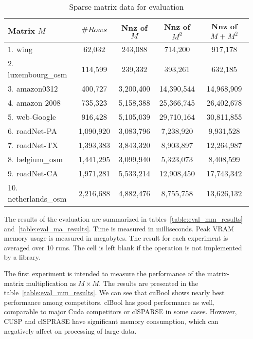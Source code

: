 {\setlength{\tabcolsep}{0.3em}
\begin{table}
\centering
{
\caption{Sparse matrix data for evaluation}
\label{table:sparse_matrices}
\scriptsize
{}
\begin{tabular}{|l|c|c|c|c|}
\hline
Matrix $M$           & $\# Rows$    & Nnz of $M$   & Nnz of $M^2$   & Nnz of $M + M^2$ \\
\hline
\hline
1.  wing             &    62,032    &   243,088    &    714,200     &    917,178       \\
2.  luxembourg\_osm  &   114,599    &   239,332    &    393,261     &    632,185       \\
3.  amazon0312       &   400,727    & 3,200,400    & 14,390,544     & 14,968,909       \\
4.  amazon-2008      &   735,323    & 5,158,388    & 25,366,745     & 26,402,678       \\
5.  web-Google       &   916,428    & 5,105,039    & 29,710,164     & 30,811,855       \\
6.  roadNet-PA       & 1,090,920    & 3,083,796    &  7,238,920     &  9,931,528       \\
7.  roadNet-TX       & 1,393,383    & 3,843,320    &  8,903,897     & 12,264,987       \\
8.  belgium\_osm     & 1,441,295    & 3,099,940    &  5,323,073     &  8,408,599       \\
9.  roadNet-CA       & 1,971,281    & 5,533,214    & 12,908,450     & 17,743,342       \\
10. netherlands\_osm & 2,216,688    & 4,882,476    &  8,755,758     & 13,626,132       \\ 
\hline
\end{tabular}
}
\end{table}
}

The results of the evaluation are summarized in tables~\ref{table:eval_mm_results} and~\ref{table:eval_ma_results}.
Time is measured in milliseconds. 
Peak VRAM memory usage is measured in megabytes.
The result for each experiment is averaged over 10 runs.
The cell is left blank if the operation is not implemented by a library.

The first experiment is intended to measure the performance of the matrix-matrix multiplication as $M \times M$.
The results are presented in the table~\ref{table:eval_mm_results}.
We can see that cuBool shows nearly best performance among competitors.
clBool has good performance as well, comparable to major Cuda competitors or clSPARSE in some cases.  
However, CUSP and clSPRASE have significant memory consumption,
which can negatively affect on processing of large data.

